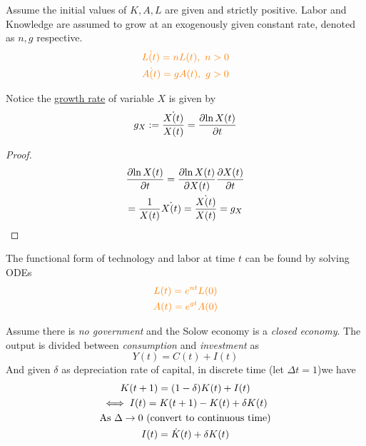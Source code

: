 \documentclass[]{article}
\begin{document}
			\begin{assumption}
				Assume the initial values of $K, A, L$ are given and strictly positive. Labor and Knowledge are assumed to grow at an exogenously given constant rate, denoted as $n, g$ respective.
				\begin{gather}
				\textcolor{orange}{
					\dot{L(t)} = nL(t),\ n > 0 }\\
					\textcolor{orange}{
						\dot{A(t)} = gA(t),\ g > 0
					}
				\end{gather}
			\end{assumption}
			
			\begin{proposition}
				Notice the \ul{growth rate} of variable $X$ is given by 
				\[
					g_X := \frac{\dot{X(t)}}{X(t)} = \frac{\partial{\ln{X(t)}}}{\partial{t}}
				\]
			\end{proposition}
			\begin{proof}
				\begin{gather*}
					\frac{\partial{\ln{X(t)}}}{\partial{t}} = \frac{\partial{\ln{X(t)}}}{\partial{X(t)}} \frac{\partial{X(t)}}{\partial{t}} \\
					= \frac{1}{X(t)} \dot{X(t)}
					= \frac{\dot{X(t)}}{X(t)}
					= g_X \\
				\end{gather*}
			\end{proof}
			
			\begin{proposition}
				The functional form of technology and labor at time $t$ can be found by solving ODEs 
				\begin{gather}
					\textcolor{orange}{
						L(t) = e^{nt} L(0)
						} \\
					\textcolor{orange}{
						A(t) = e^{gt} A(0)
						}
				\end{gather}
			\end{proposition}
			
			\par Assume there is \emph{no government} and the Solow economy is a \emph{closed economy}. The output is divided between \emph{consumption} and \emph{investment} as 
			\[
				Y(t) = C(t) + I(t)
			\]
			And given $\delta$ as depreciation rate of capital, in discrete time (let $\Delta t = 1$)we have 
			\begin{gather*}
				K(t+1) = (1-\delta)K(t) + I(t) \\
				\iff I(t) = K(t+1) - K(t) + \delta K(t) \\
				\text{{As }} \Delta \to 0 \text{{ (convert to continuous time)}}\\
				I(t) = \dot{K}(t) + \delta K(t)
			\end{gather*}
			
\end{document}
